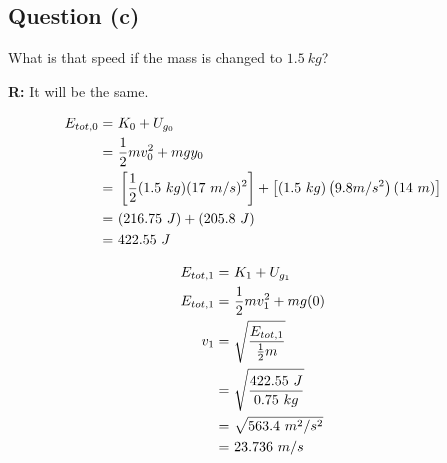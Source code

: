 	\subsection{Question (c)}

		What is that speed if the mass is changed to $1.5 \ kg$?

		\textbf{R:} It will be the same.

		\begin{align}
			E_{tot,0} = \ &K_{0} + U_{g_{0}}& \notag \\
			= \ &\frac{1}{2}mv_{0}^{2} + mgy_{0}& \notag \\
			= \ &\left[\frac{1}{2}(1.5 \ kg)(17 \ m/s)^{2}\right] + \left[(1.5 \ kg)\left(9.8 m/s^{2}\right)(14 \ m)\right]& \notag \\
			= \ &(216.75 \ J) + (205.8 \ J)& \notag \\
			= \ &422.55 \ J& \notag
		\end{align}

		\begin{align}
			E_{tot,1} = \ &K_{1} + U_{g_{1}}& \notag \\
			E_{tot,1} = \ &\frac{1}{2} mv_{1}^{2} + mg(0)& \notag \\
			v_{1} = \ &\sqrt{\frac{E_{tot,1}}{\frac{1}{2}m}}& \notag \\
			= \ &\sqrt{\frac{422.55 \ J}{0.75 \ kg}}& \notag \\
			= \ &\sqrt{563.4 \ m^{2}/s^{2}}& \notag \\
			= \ &23.736 \ m/s&
		\end{align}
